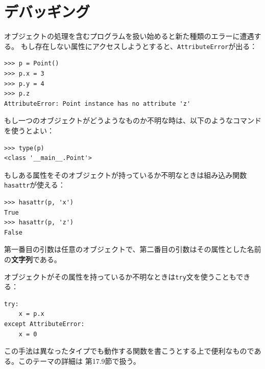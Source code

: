 \documentclass[a4j,12pt,makeidx]{jbook}
\begin{document}
\section{デバッギング}
オブジェクトの処理を含むプログラムを扱い始めると新た種類のエラーに遭遇する。
もし存在しない属性にアクセスしようとすると、{\tt AttributeError}が出る：
\begin{verbatim}
>>> p = Point()
>>> p.x = 3
>>> p.y = 4
>>> p.z
AttributeError: Point instance has no attribute 'z'
\end{verbatim}
もし一つのオブジェクトがどうようなものか不明な時は、以下のようなコマンドを使うとよい：
\begin{verbatim}
>>> type(p)
<class '__main__.Point'>
\end{verbatim}
もしある属性をそのオブジェクトが持っているか不明なときは組み込み関数{\tt hasattr}が使える：
\begin{verbatim}
>>> hasattr(p, 'x')
True
>>> hasattr(p, 'z')
False
\end{verbatim}
第一番目の引数は任意のオブジェクトで、第二番目の引数はその属性とした名前の{\bf 文字列}である。\par
オブジェクトがその属性を持っているか不明なときは{\tt try}文を使うこともできる：
\begin{verbatim}
try:
    x = p.x
except AttributeError:
    x = 0
\end{verbatim}
この手法は異なったタイプでも動作する関数を書こうとする上で便利なものである。このテーマの詳細は
第17.9節で扱う。
%
\end{document}
